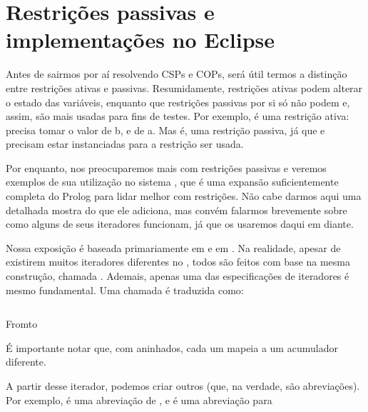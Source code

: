 
%

%
%

%

\section{Restrições passivas e implementações no Eclipse}

Antes de sairmos por aí resolvendo CSPs e COPs, será útil termos a distinção entre restrições ativas
e passivas. Resumidamente, restrições ativas podem alterar o estado das variáveis, enquanto que
restrições passivas por si só não podem e, assim, são mais usadas para fins de testes. Por exemplo,
 é uma restrição ativa:  precisa tomar o valor de b, e  de a. Mas
 é, uma restrição passiva, já que  e  precisam estar instanciadas
para a restrição ser usada.

Por enquanto, nos preocuparemos mais com restrições passivas e veremos exemplos de sua utilização no
sistema \eclipse, que é uma expansão suficientemente completa do Prolog para lidar melhor com restrições. Não
cabe darmos aqui uma detalhada mostra do que ele adiciona, mas convém falarmos brevemente
sobre como alguns de seus iteradores funcionam, já que os usaremos daqui em diante.

Nossa exposição é baseada primariamente em \cite{joachim} e em \cite{schimpf}. Na realidade,
apesar de existirem muitos iteradores diferentes no \eclipse, todos são feitos com base na mesma
construção, chamada . Ademais, apenas uma das especificações de iteradores é mesmo
fundamental. Uma chamada  é traduzida como:

    \begin{listing}
\inputminted{prolog}{../Exemplos/Cap8/prog8_fromto.pl}
\caption{Fromto}
    \end{listing}

\noindent É importante notar que, com  aninhados, cada um mapeia a um acumulador
diferente.

A partir desse iterador, podemos criar outros (que, na verdade, são abreviações). Por exemplo,
 é uma abreviação de , e  é uma abreviação para 


